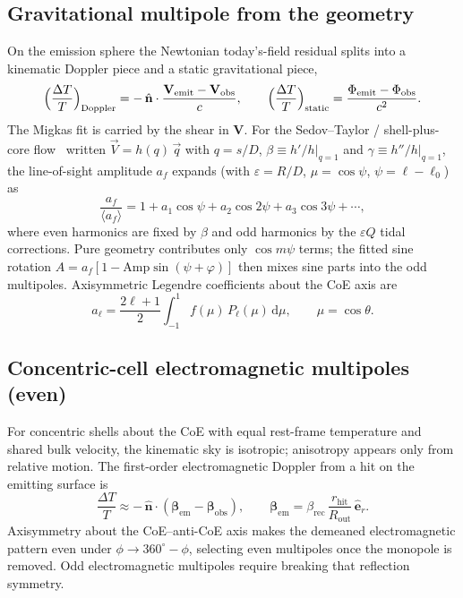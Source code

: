 \documentclass[11pt,a4paper]{article}
\begin{document}
\subsection{Gravitational multipole from the geometry}

On the emission sphere the Newtonian today's-field residual splits into a kinematic Doppler piece and a static gravitational piece,
\begin{equation}
\Bigl(\frac{\Delta T}{T}\Bigr)_{\mathrm{Doppler}}
=
-\,\hat{\mathbf{n}}\cdot\frac{\mathbf{V}_{\mathrm{emit}}-\mathbf{V}_{\mathrm{obs}}}{c},
\qquad
\Bigl(\frac{\Delta T}{T}\Bigr)_{\mathrm{static}}
=
\frac{\Phi_{\mathrm{emit}}-\Phi_{\mathrm{obs}}}{c^{2}}.
\end{equation}
The Migkas fit is carried by the shear in \(\mathbf{V}\). For the Sedov--Taylor / shell-plus-core flow~\cite{sedov1946,taylor1950} written \(\vec{V}=h(q)\,\vec{q}\) with \(q=s/D\), \(\beta\equiv h'/h|_{q=1}\) and \(\gamma\equiv h''/h|_{q=1}\), the line-of-sight amplitude \(a_f\) expands (with \(\varepsilon=R/D\), \(\mu=\cos\psi\), \(\psi=\ell-\ell_0\)) as
\begin{equation}
\frac{a_f}{\langle a_f\rangle}
=
1+a_1\cos\psi+a_2\cos 2\psi+a_3\cos 3\psi+\cdots,
\end{equation}
where even harmonics are fixed by \(\beta\) and odd harmonics by the \(\varepsilon Q\) tidal corrections. Pure geometry contributes only \(\cos m\psi\) terms; the fitted sine rotation \(A=a_f[1-\mathrm{Amp}\sin(\psi+\varphi)]\) then mixes sine parts into the odd multipoles. Axisymmetric Legendre coefficients about the CoE axis are
\begin{equation}
a_\ell
=
\frac{2\ell+1}{2}
\int_{-1}^{1}
f(\mu)\,P_\ell(\mu)\,\mathrm{d}\mu,
\qquad
\mu=\cos\theta.
\end{equation}

\subsection{Concentric-cell electromagnetic multipoles (even)}

For concentric shells about the CoE with equal rest-frame temperature and shared bulk velocity, the kinematic sky is isotropic; anisotropy appears only from relative motion. The first-order electromagnetic Doppler from a hit on the emitting surface is
\begin{equation}
\frac{\Delta T}{T}
\approx
-\,\hat{\mathbf{n}}\cdot(\boldsymbol\beta_{\mathrm{em}}-\boldsymbol\beta_{\mathrm{obs}}),
\qquad
\boldsymbol\beta_{\mathrm{em}}
=
\beta_{\mathrm{rec}}\,\frac{r_{\mathrm{hit}}}{R_{\mathrm{out}}}\,\hat{\mathbf{e}}_r.
\end{equation}
Axisymmetry about the CoE--anti-CoE axis makes the demeaned electromagnetic pattern even under \(\phi\to360^\circ-\phi\), selecting even multipoles once the monopole is removed. Odd electromagnetic multipoles require breaking that reflection symmetry.
\end{document}
